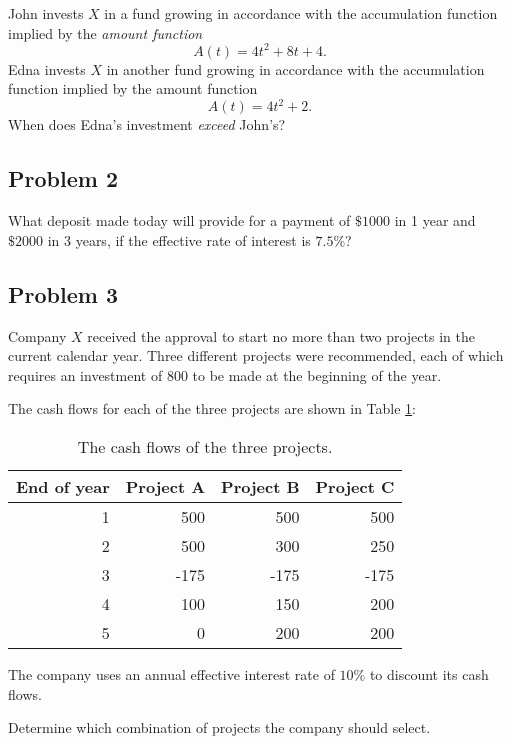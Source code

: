 \documentclass[
]{book}
\begin{document}
John invests \(X\) in a fund growing in accordance with the accumulation function implied by the \emph{amount function}
\[A(t)=4t^2+8t+4.\]
Edna invests \(X\) in another fund growing in accordance with the accumulation function implied by the amount function \[A(t)=4t^2+2.\]
When does Edna's investment \emph{exceed} John's?

\hypertarget{problem-2-2}{%
\subsection*{Problem 2}\label{problem-2-2}}

What deposit made today will provide for a payment of \(\$1000\) in 1 year and \(\$2000\) in 3 years, if the effective rate of interest is \(7.5\%\)?

\hypertarget{problem-3-2}{%
\subsection*{Problem 3}\label{problem-3-2}}

Company \(X\) received the approval to start no more than two projects in the current calendar year.
Three different projects were recommended, each of which requires an investment of 800 to be made at the beginning of the year.

The cash flows for each of the three projects are shown in Table \ref{tab:week1}:

\begin{table}

\caption{\label{tab:week1}The cash flows of the three projects.}
\centering
\begin{tabular}[t]{r|r|r|r}
\hline
End of year & Project A & Project B & Project C\\
\hline
1 & 500 & 500 & 500\\
\hline
2 & 500 & 300 & 250\\
\hline
3 & -175 & -175 & -175\\
\hline
4 & 100 & 150 & 200\\
\hline
5 & 0 & 200 & 200\\
\hline
\end{tabular}
\end{table}

The company uses an annual effective interest rate of \(10\%\) to discount its cash flows.

Determine which combination of projects the company should select.
\end{document}
